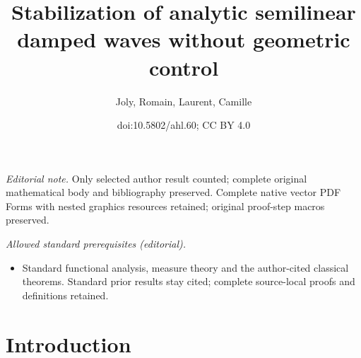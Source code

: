 \documentclass[10pt]{amsart}
\title{Stabilization of analytic semilinear damped waves without geometric control}
\author{Joly, Romain, Laurent, Camille}
\date{doi:10.5802/ahl.60; CC BY 4.0}
\theoremstyle{definition}\newtheorem{defi}[theo]{Definition}\newtheorem{rema}[theo]{Remark}\newtheorem{exam}[theo]{Example}\newtheorem{exem}[theo]{Example}\newtheorem{nota}[theo]{Notation}
\begin{document}
\maketitle
\noindent\textit{Editorial note.} Only selected author result counted; complete original mathematical body and bibliography preserved. Complete native vector PDF Forms with nested graphics resources retained; original proof-step macros preserved.\par\medskip
\noindent\textit{Allowed standard prerequisites (editorial).}\begin{itemize}
\item Standard functional analysis, measure theory and the author-cited classical theorems. Standard prior results stay cited; complete source-local proofs and definitions retained.
\end{itemize}\medskip


\section{Introduction}
\end{document}
